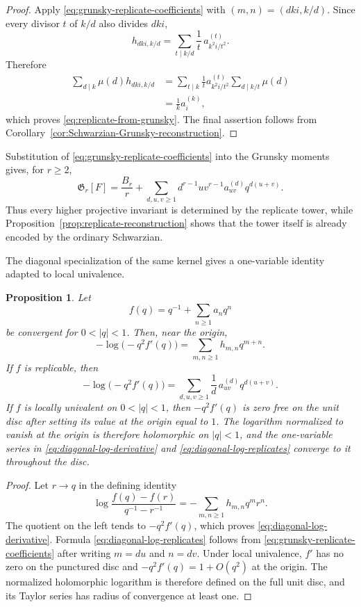 \documentclass[11pt]{amsart}
\newtheorem{prop}[thm]{Proposition}
\theoremstyle{definition}
\theoremstyle{remark}
\numberwithin{equation}{section}
\begin{document}
\begin{proof}
Apply \eqref{eq:grunsky-replicate-coefficients} with $(m,n)=(dki,k/d)$. Since every divisor $t$ of $k/d$ also divides $dki$,
\[
h_{dki,k/d}
=
\sum_{t\mid k/d}\frac1t\,a_{k^2i/t^2}^{(t)}.
\]
Therefore
\begin{align*}
\sum_{d\mid k}\mu(d)h_{dki,k/d}
&=
\sum_{t\mid k}\frac1t a_{k^2i/t^2}^{(t)}
\sum_{d\mid k/t}\mu(d)\\
&=\frac1k a_i^{(k)},
\end{align*}
which proves \eqref{eq:replicate-from-grunsky}. The final assertion follows from Corollary~\ref{cor:Schwarzian-Grunsky-reconstruction}.
\end{proof}

Substitution of \eqref{eq:grunsky-replicate-coefficients} into the Grunsky moments gives, for $r\geq2$,
\begin{equation}\label{eq:replicate-moment-expansion}
\mathfrak G_r[F]
=
\frac{B_r}{r}
+
\sum_{d,u,v\geq1}
 d^{r-1}u v^{r-1}a_{uv}^{(d)}q^{d(u+v)}.
\end{equation}
Thus every higher projective invariant is determined by the replicate tower, while Proposition~\ref{prop:replicate-reconstruction} shows that the tower itself is already encoded by the ordinary Schwarzian.

The diagonal specialization of the same kernel gives a one-variable identity adapted to local univalence.

\begin{prop}\label{prop:diagonal-log-derivative}
Let
\[
f(q)=q^{-1}+\sum_{n\geq1}a_nq^n
\]
be convergent for $0<|q|<1$. Then, near the origin,
\begin{equation}\label{eq:diagonal-log-derivative}
-\log\bigl(-q^2f'(q)\bigr)
=
\sum_{m,n\geq1}h_{m,n}q^{m+n}.
\end{equation}
If $f$ is replicable, then
\begin{equation}\label{eq:diagonal-log-replicates}
-\log\bigl(-q^2f'(q)\bigr)
=
\sum_{d,u,v\geq1}\frac1d\,a_{uv}^{(d)}q^{d(u+v)}.
\end{equation}
If $f$ is locally univalent on $0<|q|<1$, then $-q^2f'(q)$ is zero free on the unit disc after setting its value at the origin equal to $1$. The logarithm normalized to vanish at the origin is therefore holomorphic on $|q|<1$, and the one-variable series in \eqref{eq:diagonal-log-derivative} and \eqref{eq:diagonal-log-replicates} converge to it throughout the disc.
\end{prop}

\begin{proof}
Let $r\to q$ in the defining identity
\[
\log\frac{f(q)-f(r)}{q^{-1}-r^{-1}}
=-\sum_{m,n\geq1}h_{m,n}q^mr^n.
\]
The quotient on the left tends to $-q^2f'(q)$, which proves \eqref{eq:diagonal-log-derivative}. Formula \eqref{eq:diagonal-log-replicates} follows from \eqref{eq:grunsky-replicate-coefficients} after writing $m=du$ and $n=dv$. Under local univalence, $f'$ has no zero on the punctured disc and $-q^2f'(q)=1+O(q^2)$ at the origin. The normalized holomorphic logarithm is therefore defined on the full unit disc, and its Taylor series has radius of convergence at least one.
\end{proof}
\end{document}
